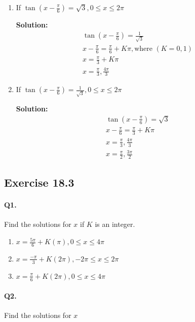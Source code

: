 \documentclass{article}
\begin{document}
\begin{enumerate}[label=\alph*)]
  \item If $\tan \left(x - \frac{\pi}{6} \right) = \sqrt{3}, 0 \leq x \leq 2\pi$

        {\scriptsize \textbf{Solution:}}
        \[
        \begin{aligned}
          \tan \left(x - \frac{\pi}{6} \right) = \frac{1}{\sqrt{3}} \\
          x - \frac{\pi}{6} = \frac{\pi}{6} + K\pi, \text{where }(K = 0, 1) \\
          x = \frac{\pi}{3} + K\pi \\
          x = \frac{\pi}{3}, \frac{4\pi}{3}
        \end{aligned}
        \]

  \item If $\tan \left(x - \frac{\pi}{6} \right) = \frac{1}{\sqrt{3}}, 0 \leq x \leq 2\pi$

        {\scriptsize \textbf{Solution:}}
        \[
        \begin{aligned}
          \tan \left(x - \frac{\pi}{6} \right) = \sqrt{3} \\
          x - \frac{\pi}{6} = \frac{\pi}{3} + K\pi \\
          x = \frac{\pi}{3}, \frac{4\pi}{3} \\
          x = \frac{\pi}{2}, \frac{3\pi}{2}
        \end{aligned}
        \]
\end{enumerate}

\subsection {Exercise 18.3}
\paragraph{Q1.}
Find the solutions for $x$ if $K$ is an integer.

\begin{enumerate}[label=\alph*)]
  \item $x=\frac{5\pi}{6} + K(\pi), 0 \leq x \leq 4\pi$
  \item $x=\frac{-\pi}{3} + K(2\pi), -2\pi \leq x \leq 2\pi$
  \item $x=\frac{\pi}{6} + K(2\pi), 0 \leq x \leq 4\pi$
\end{enumerate}

\paragraph{Q2.}
Find the solutions for $x$
\end{document}
